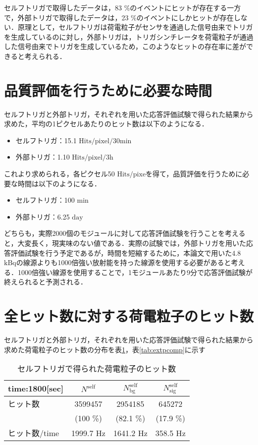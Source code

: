 セルフトリガで取得したデータは，83 \%のイベントにヒットが存在する一方で，外部トリガで取得したデータは，23 \%のイベントにしかヒットが存在しない．原理として，セルフトリガは荷電粒子がセンサを通過した信号由来でトリガを生成しているのに対し，外部トリガは，トリガシンチレータを荷電粒子が通過した信号由来でトリガを生成しているため，このようなヒットの存在率に差ができると考えられる．

\section{品質評価を行うために必要な時間}
\label{sec:conc2}
セルフトリガと外部トリガ，それぞれを用いた応答評価試験で得られた結果から求めた，平均の1ピクセルあたりのヒット数は以下のようになる．

\begin{itemize}
\item セルフトリガ：15.1 $\mathrm{Hits/pixel/30min}$
\item 外部トリガ：1.10 $\mathrm{Hits/pixel/3h}$
\end{itemize}

これより求められる，各ピクセル50 $\mathrm{Hits/pixe}$を得て，品質評価を行うために必要な時間は以下のようになる．
\begin{itemize}
\item セルフトリガ：100 $\mathrm{min}$
\item 外部トリガ：6.25 $\mathrm{day}$
\end{itemize}

どちらも，実際2000個のモジュールに対して応答評価試験を行うことを考えると，大変長く，現実味のない値である．実際の試験では，外部トリガを用いた応答評価試験を行う予定であるが，時間を短縮するために，本論文で用いた4.8 $\mathrm{kBq}$の線源よりも1000倍強い放射能を持った線源を使用する必要があると考える．1000倍強い線源を使用することで，1モジュールあたり9分で応答評価試験が終えられると予測される．

\section{全ヒット数に対する荷電粒子のヒット数}
\label{sec:conc3}
セルフトリガと外部トリガ，それぞれを用いた応答評価試験で得られた結果から求めた荷電粒子のヒット数の分布を表\ref{tab:selfpcomp}，表\ref{tab:extpcomp}に示す

\begin{table}[h]
  \centering
  \caption{セルフトリガで得られた荷電粒子のヒット数}
  \begin{tabular} {l|ccc} \hline
    time:1800[sec]& $N^{\mathrm{self}}$ & $N_{\mathrm{bg}}^{\mathrm{self}}$ & $N_{\mathrm{sig}}^{\mathrm{self}}$ \\ \hline \hline
    ヒット数 & 3599457 & 2954185 & 645272 \\
    & (100 \%) & (82.1 \%) & (17.9 \%) \\ \hline
    ヒット数/time & 1999.7 $\mathrm{Hz}$ & 1641.2 $\mathrm{Hz}$ & 358.5 $\mathrm{Hz}$ \\ \hline
  \end{tabular}
  \label{tab:selfpcomp}
\end{table}


